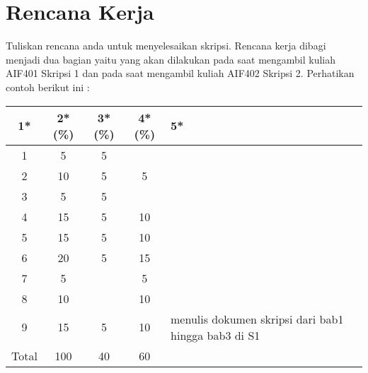 \documentclass[a4paper,twoside]{article}
\begin{document}
\section{Rencana Kerja}
Tuliskan rencana anda untuk menyelesaikan skripsi. Rencana kerja dibagi menjadi dua bagian yaitu yang akan dilakukan pada saat mengambil kuliah AIF401 Skripsi 1 dan pada saat mengambil kuliah AIF402 Skripsi 2. Perhatikan contoh berikut ini :


\begin{center}
  \begin{tabular}{ | c | c | c | c | l |}
    \hline
    1*  & 2*(\%) & 3*(\%) & 4*(\%) &5*\\ \hline \hline
    1 & 5 & 5 & & \\ \hline
    2 & 10 & 5 & 5 & \\ \hline
    3 & 5 & 5 & & \\ \hline
    4 & 15 & 5 & 10 & \\ \hline
    5 & 15 & 5 & 10 & \\ \hline
    6 & 20 & 5 & 15 & \\ \hline
    7 & 5 &  & 5 & \\ \hline
    8 & 10 &  & 10 & \\ \hline
    9 & 15 & 5 & 10 & {\footnotesize menulis dokumen skripsi dari bab1 hingga bab3 di S1} \\ \hline
    Total & 100 & 40 & 60 & \\ \hline
                          \end{tabular}
\end{center}
\end{document}
